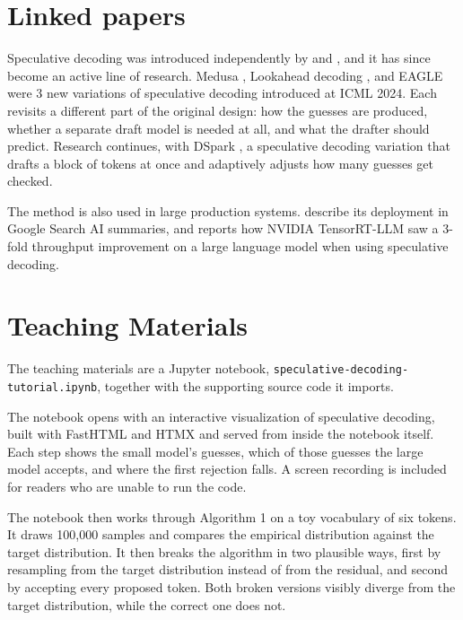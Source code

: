 \documentclass{article}
\begin{document}
\section{Linked papers}

Speculative decoding was introduced independently by \citet{leviathan_fast_2023} and \citet{chen_accelerating_2023}, and it has since become an active line of research. Medusa \citep{cai_medusa_2024}, Lookahead decoding \citep{fu_break_2024}, and EAGLE \citep{li_eagle_2024} were 3 new variations of speculative decoding introduced at ICML 2024. Each revisits a different part of the original design: how the guesses are produced, whether a separate draft model is needed at all, and what the drafter should predict. Research continues, with DSpark \citet{cheng_dspark_2026}, a speculative decoding variation that drafts a block of tokens at once and adaptively adjusts how many guesses get checked.

The method is also used in large production systems. \citet{leviathan_looking_2024} describe its deployment in Google Search AI summaries, and \citet{shah_boost_2024} reports how NVIDIA TensorRT-LLM saw a 3-fold throughput improvement on a large language model when using speculative decoding.

\section{Teaching Materials}

The teaching materials are a Jupyter notebook, \texttt{speculative-decoding-tutorial.ipynb}, together with the supporting source code it imports.

The notebook opens with an interactive visualization of speculative decoding, built with FastHTML and HTMX and served from inside the notebook itself. Each step shows the small model's guesses, which of those guesses the large model accepts, and where the first rejection falls. A screen recording is included for readers who are unable to run the code.

The notebook then works through Algorithm 1 on a toy vocabulary of six tokens. It draws 100,000 samples and compares the empirical distribution against the target distribution. It then breaks the algorithm in two plausible ways, first by resampling from the target distribution instead of from the residual, and second by accepting every proposed token. Both broken versions visibly diverge from the target distribution, while the correct one does not.
\end{document}
